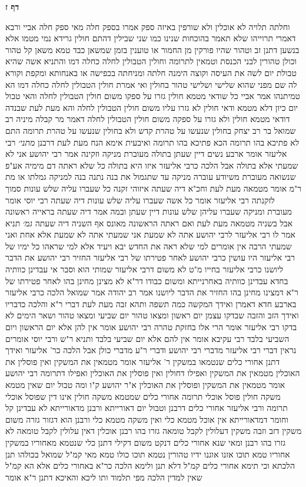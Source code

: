 \documentclass[12pt, openany]{book}
\newcommand{\sethebfont}{
\fontsize{10.5pt}{21.0pt} \selectfont
}
\newcommand{\twocol}[1]{
	{\sethebfont \begin{multicols}{2}
			#1
	\end{multicols}}	
}
\newcommand{\sectname}{}
\newcommand{\newsection}[1]{
	\addcontentsline{toc}{section}{#1}
	\renewcommand{\sectname}{#1}	
	\vspace{-\baselineskip}
	\begin{center}
		\textbf{%
\fontsize{16pt}{16pt}\selectfont
			#1}
	\end{center}
	\vspace{-\baselineskip}
	\nopagebreak
}
\begin{document}
\newsection{דף ז}
\twocol{וחלתה תלויה לא אוכלין ולא שורפין  באיזה ספק אמרו  בספק חלה  מאי ספק חלה 
אביי ורבא דאמרי תרוייהו  שלא תאמר בהוכחות שנינו כמו שני שבילין דהתם חולין גרידא נמי מטמו
אלא בנשען  דתנן  זב וטהור שהיו פורקין מן החמור או טוענין  בזמן שמשאן כבד טמא משאן קל טהור וכולן טהורין לבני הכנסת וטמאין לתרומה 
וחולין הטבולין לחלה כחלה דמו  והתניא  אשה שהיא טבולת יום לשה את העיסה וקוצה הימנה חלתה ומניחתה בכפישה או באנחותא ומקפת וקורא לה שם
מפני שהוא שלישי ושלישי טהור בחולין  ואי אמרת חולין הטבולין לחלה כחלה דמו הא טמיתנהו 
אמר אביי  כל שודאי מטמא חולין גזרו על ספקו משום חולין הטבולין לחלה  והאי טבול יום כיון דלא מטמא ודאי חולין לא גזרו עליו משום חולין הטבולין לחלה 
והא מעת לעת שבנדה דודאי מטמא חולין ולא גזרו על ספקה משום חולין הטבולין לחלה 
דאמר מר  קבלה מיניה רב שמואל בר רב יצחק בחולין  שנעשו על טהרת קדש ולא בחולין שנעשו על טהרת תרומה 
התם לא פתיכא בהו תרומה הכא פתיכא בהו תרומה 
ואיבעית אימא  הנח מעת לעת דרבנן
{\large\emph{מתני׳}} רבי אליעזר אומר ארבע נשים דיין שעתן בתולה מעוברת מניקה וזקינה  אמר רבי יהושע  אני לא שמעתי אלא בתולה
אבל הלכה כרבי אליעזר 
איזו היא בתולה כל שלא ראתה דם מימיה אע"פ שנשואה  מעוברת משיודע עוברה  מניקה עד שתגמול את בנה  נתנה בנה למניקה גמלתו או מת ר"מ אומר  מטמאה מעת לעת וחכ"א  דיה שעתה 
איזוהי זקנה כל שעברו עליה שלש עונות סמוך לזקנתה  רבי אליעזר אומר  כל אשה שעברו עליה שלש עונות דיה שעתה  רבי יוסי אומר  מעוברת ומניקה שעברו עליהן שלש עונות דיין שעתן 
ובמה אמר דיה שעתה בראייה ראשונה אבל בשניה מטמאה מעת לעת  ואם ראתה הראשונה מאונס אף השניה דיה שעתה
{\large\emph{גמ׳}} תניא אמר לו רבי אליעזר לרבי יהושע אתה לא שמעת אני שמעתי  אתה לא שמעת אלא אחת ואני שמעתי הרבה 
אין אומרים למי שלא ראה את החדש  יבא ויעיד אלא למי שראהו  כל ימיו של רבי אליעזר היו עושין כרבי יהושע לאחר פטירתו של רבי אליעזר החזיר רבי יהושע את הדבר ליושנו 
כרבי אליעזר בחייו מ"ט לא  משום דרבי אליעזר שמותי הוא וסבר  אי עבדינן כוותיה בחדא עבדינן כוותיה באחרנייתא
ומשום כבודו דר"א לא מצינן מחינן בהו  לאחר פטירתו של ר"א דמצינו מחינן בהו החזיר את הדבר ליושנו 
אמר רב יהודה אמר שמואל  הלכה כרבי אליעזר בארבע  חדא דאמרן 
ואידך  המקשה כמה תשפה ותהא זבה מעת לעת דברי ר"א והלכה כדבריו 
ואידך  הזב והזבה שבדקו עצמן יום ראשון ומצאו טהור יום שביעי ומצאו טהור ושאר הימים לא בדקו רבי אליעזר אומר  הרי אלו בחזקת טהרה  רבי יהושע אומר  אין להן אלא יום הראשון ויום השביעי בלבד 
רבי עקיבא אומר  אין להם אלא יום שביעי בלבד  ותניא ר"ש ורבי יוסי אומרים  נראין דברי רבי אליעזר מדברי רבי יהושע ודברי ר"ע מדברי כולן אבל הלכה כר' אליעזר 
ואידך דתנן  אחורי כלים שנטמאו במשקין ר' אליעזר אומר  מטמאין את המשקין ואין פוסלין את האוכלין מטמאין את המשקין ואפילו דחולין ואין פוסלין את האוכלין ואפילו דתרומה  רבי יהושע אומר  מטמאין את המשקין ופוסלין את האוכלין 
א"ר יהושע  ק"ו ומה טבול יום שאין מטמא משקה חולין פוסל אוכלי תרומה אחורי כלים שמטמא משקה חולין אינו דין שפוסל אוכלי תרומה 
ורבי אליעזר אחורי כלים דרבנן וטבול יום דאורייתא ורבנן מדאורייתא לא עבדינן קל וחומר  דמדאורייתא אין אוכל מטמא כלי ואין משקה מטמא כלי
ורבנן הוא דגזור גזרה משום משקין דזב וזבה  משקין דעלולין לקבל טומאה גזרו בהו רבנן אוכלין דאין עלולין לקבל טומאה לא גזרו בהו רבנן 
ומאי שנא אחורי כלים דנקט משום דקילי דתנן  כלי שנטמא מאחוריו במשקין אחוריו טמא תוכו אזנו אוגנו ידיו טהורין  נטמא תוכו כולו טמא 
מאי קמ"ל שמואל  בכולהו תנן הלכתא 
וכי תימא  אחורי כלים קמ"ל דלא תנן  ולימא הלכה כר"א באחורי כלים  אלא הא קמ"ל  שאין למדין הלכה מפי תלמוד 
ותו ליכא  והאיכא דתנן ר"א אומר}
\end{document}
